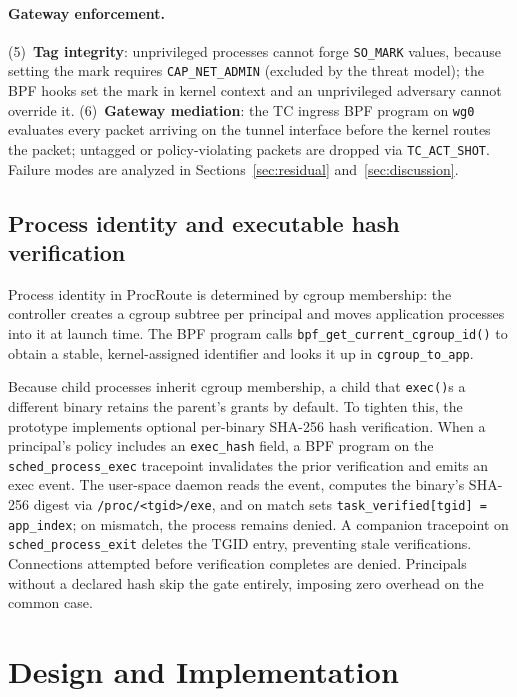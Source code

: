 \documentclass[sigconf]{acmart}
\begin{document}
\paragraph{Gateway enforcement.}
(5)~\textbf{Tag integrity}: unprivileged processes cannot forge
\texttt{SO\_MARK} values, because setting the mark requires
\texttt{CAP\_NET\_ADMIN} (excluded by the threat model);
the BPF hooks set the mark in kernel context and an
unprivileged adversary cannot override it.
(6)~\textbf{Gateway mediation}: the TC ingress BPF program on
\texttt{wg0} evaluates every packet arriving on the tunnel
interface before the kernel routes the packet; untagged or
policy-violating packets are dropped via \texttt{TC\_ACT\_SHOT}.
Failure modes are analyzed in Sections~\ref{sec:residual}
and~\ref{sec:discussion}.

\subsection{Process identity and executable hash verification}
\label{sec:proc-identity}

Process identity in ProcRoute is determined by cgroup membership:
the controller creates a cgroup subtree per principal and moves
application processes into it at launch time.  The BPF program
calls \texttt{bpf\_get\_current\_cgroup\_id()} to obtain a stable,
kernel-assigned identifier and looks it up in
\texttt{cgroup\_to\_app}.

Because child processes inherit cgroup membership, a child that
\texttt{exec()}s a different binary retains the parent's grants
by default.  To tighten this, the prototype implements optional
per-binary SHA-256 hash verification.
When a principal's policy includes an \texttt{exec\_hash} field,
a BPF program on the \texttt{sched\_process\_exec} tracepoint
invalidates the prior verification and emits an exec event.
The user-space daemon reads the event, computes the binary's
SHA-256 digest via \texttt{/proc/<tgid>/exe}, and on match sets
\texttt{task\_verified[tgid] = app\_index}; on mismatch, the
process remains denied.
A companion tracepoint on \texttt{sched\_process\_exit} deletes
the TGID entry, preventing stale verifications.
Connections attempted before verification completes are denied.
Principals without a declared hash skip the gate entirely,
imposing zero overhead on the common case.

\section{Design and Implementation}
\label{sec:design}
\end{document}
